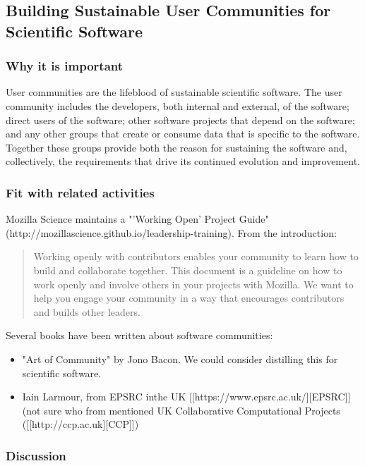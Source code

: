 \subsection{Building Sustainable User Communities for Scientific Software}

\subsubsection{Why it is important}

User communities are the lifeblood of sustainable scientific software. The user community includes the developers, 
both internal and external, of the software; direct users of the software; other software projects that depend on
the software; and any other groups that create or consume data that is specific to the software. Together these
groups provide both the reason for sustaining the software and, collectively, the requirements that drive its continued
evolution and improvement.

\subsubsection{Fit with related activities}

Mozilla Science maintains a "'Working Open' Project Guide" (http://mozillascience.github.io/leadership-training). From the introduction:
\begin{quote}
Working openly with contributors enables your
    community to learn how to build and collaborate together. This
    document is a guideline on how to work openly and involve others
    in your projects with Mozilla. We want to help you engage your
    community in a way that encourages contributors and builds other
    leaders.
  \end{quote}

Several books have been written about software communities:
\begin{itemize}
\item "Art of Community" by Jono Bacon. We could consider distilling this for scientific software.
\item Iain Larmour, from EPSRC inthe UK [[https://www.epsrc.ac.uk/][EPSRC]] (not sure who from mentioned UK Collaborative Computational Projects ([[http://ccp.ac.uk][CCP]])
\end{itemize}

\subsubsection{Discussion}

